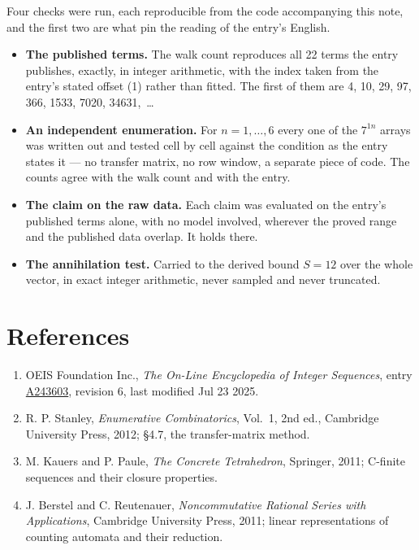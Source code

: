 \documentclass[11pt]{article}
\theoremstyle{definition}
\begin{document}
Four checks were run, each reproducible from the code accompanying this note, and the first two are what pin the reading of the entry's English.

\begin{itemize}

\item {\bfseries The published terms.} The walk count reproduces all 22 terms the entry publishes, exactly, in integer arithmetic, with the index taken from the entry's stated offset (1) rather than fitted. The first of them are 4, 10, 29, 97, 366, 1533, 7020, 34631,~\dots

\item {\bfseries An independent enumeration.} For $n = 1,\dots,6$ every one of the $7^{1n}$ arrays was written out and tested cell by cell against the condition as the entry states it --- no transfer matrix, no row window, a separate piece of code. The counts agree with the walk count and with the entry.

\item {\bfseries The claim on the raw data.} Each claim was evaluated on the entry's published terms alone, with no model involved, wherever the proved range and the published data overlap. It holds there.

\item {\bfseries The annihilation test.} Carried to the derived bound $S = 12$ over the whole vector, in exact integer arithmetic, never sampled and never truncated.

\end{itemize}

\section{References}

\begin{enumerate}

\item OEIS Foundation Inc., \emph{The On-Line Encyclopedia of Integer Sequences}, entry \href{https://oeis.org/A243603}{A243603}, revision 6, last modified Jul 23 2025.

\item R. P. Stanley, \emph{Enumerative Combinatorics}, Vol.~1, 2nd ed., Cambridge University Press, 2012; \S4.7, the transfer-matrix method.

\item M. Kauers and P. Paule, \emph{The Concrete Tetrahedron}, Springer, 2011; C-finite sequences and their closure properties.

\item J. Berstel and C. Reutenauer, \emph{Noncommutative Rational Series with Applications}, Cambridge University Press, 2011; linear representations of counting automata and their reduction.

\end{enumerate}
\end{document}
